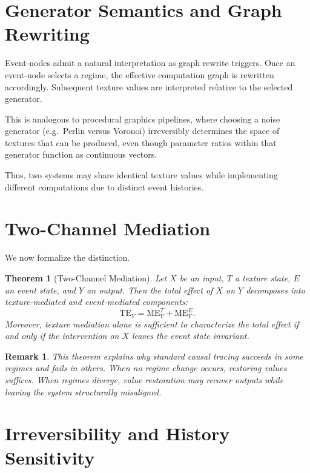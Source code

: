 \documentclass[11pt]{article}
\newtheorem{theorem}{Theorem}
\newtheorem{remark}{Remark}
\begin{document}
\section{Generator Semantics and Graph Rewriting}

Event-nodes admit a natural interpretation as graph rewrite triggers. Once an event-node selects a regime, the effective computation graph is rewritten accordingly. Subsequent texture values are interpreted relative to the selected generator.

This is analogous to procedural graphics pipelines, where choosing a noise generator (e.g.\ Perlin versus Voronoi) irreversibly determines the space of textures that can be produced, even though parameter ratios within that generator function as continuous vectors.

Thus, two systems may share identical texture values while implementing different computations due to distinct event histories.

\section{Two-Channel Mediation}

We now formalize the distinction.

\begin{theorem}[Two-Channel Mediation]
Let \(X\) be an input, \(T\) a texture state, \(E\) an event state, and \(Y\) an output. Then the total effect of \(X\) on \(Y\) decomposes into texture-mediated and event-mediated components:
\[
\mathrm{TE}_Y = \mathrm{ME}^T_Y + \mathrm{ME}^E_Y.
\]
Moreover, texture mediation alone is sufficient to characterize the total effect if and only if the intervention on \(X\) leaves the event state invariant.
\end{theorem}

\begin{remark}
This theorem explains why standard causal tracing succeeds in some regimes and fails in others. When no regime change occurs, restoring values suffices. When regimes diverge, value restoration may recover outputs while leaving the system structurally misaligned.
\end{remark}

\section{Irreversibility and History Sensitivity}
\end{document}
